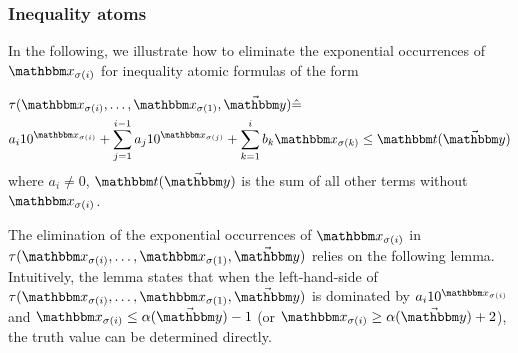 \subsubsection{Inequality atoms}
In the following, we illustrate how to eliminate the exponential occurrences of $\ivarx_{\sigma(i)}$ for inequality atomic formulas of the form 

\vspace*{-2mm}

\begin{equation}\label{tau}
    \begin{aligned}
        &\tau(\ivarx_{\sigma(i)}, \ldots, \ivarx_{\sigma(1)}, \vec{\ivary}) \Def  \\
        &a_i 10^{\ivarx_{\sigma(i)}}+\sum_{j=1}^{i-1} a_j 10^{\ivarx_{\sigma(j)}} + \sum_{k=1}^{i}b_k \ivarx_{\sigma(k)} \le \iterm(\vec{\ivary})
    \end{aligned}            
\end{equation}
where $a_i\neq 0$, $\iterm(\vec \ivary)$ is the sum of all other terms without $\ivarx_{\sigma(i)}$.

The elimination of the exponential occurrences of $\ivarx_{\sigma(i)}$ in $\tau(\ivarx_{\sigma(i)}, \ldots, \ivarx_{\sigma(1)}, \vec{\ivary})$ relies on the following lemma. 
Intuitively, 
the lemma states that when the left-hand-side of $\tau(\ivarx_{\sigma(i)}, \ldots, \ivarx_{\sigma(1)}, \vec{\ivary})$ is dominated by $a_i 10^{\ivarx_{\sigma(i)}}$ and $\ivarx_{\sigma(i)}\le \alpha(\vec{\ivary})-1$ (or $\ivarx_{\sigma(i)} \ge \alpha(\vec{\ivary})+2$), 
the truth value can be determined directly.

